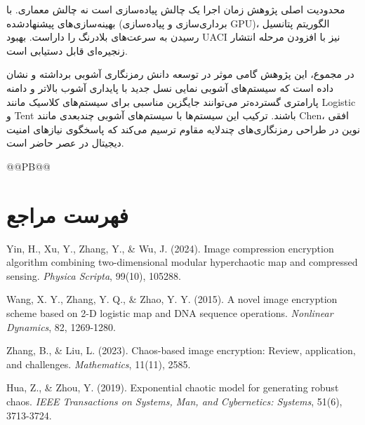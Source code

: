 محدودیت اصلی پژوهش  زمان اجرا یک چالش پیاده‌سازی است نه چالش معماری. با بهینه‌سازی‌های پیشنهادشده (برداری‌سازی و پیاده‌سازی GPU)، الگوریتم پتانسیل رسیدن به سرعت‌های بلادرنگ را داراست. بهبود UACI نیز با افزودن مرحله انتشار زنجیره‌ای قابل دستیابی است.

در مجموع، این پژوهش گامی موثر در توسعه دانش رمزنگاری آشوبی برداشته و نشان داده است که سیستم‌های آشوبی نمایی نسل جدید با پایداری آشوب بالاتر و دامنه پارامتری گسترده‌تر می‌توانند جایگزین مناسبی برای سیستم‌های کلاسیک مانند Logistic و Tent باشند. ترکیب این سیستم‌ها با سیستم‌های آشوبی چندبعدی مانند  Chen،  افقی نوین در طراحی رمزنگاری‌های چندلایه مقاوم ترسیم می‌کند که پاسخگوی نیازهای امنیت دیجیتال در عصر حاضر است.


@@PB@@




\renewcommand{\bibname}{فهرست منابع}
\addcontentsline{toc}{chapter}{\bibname}


\chapter*{فهرست مراجع}




 Yin, H., Xu, Y., Zhang, Y., \& Wu, J. (2024). Image compression encryption algorithm combining two-dimensional modular hyperchaotic map and compressed sensing. \textit{Physica Scripta}, 99(10), 105288.



 Wang, X. Y., Zhang, Y. Q., \& Zhao, Y. Y. (2015). A novel image encryption scheme based on 2-D logistic map and DNA sequence operations. \textit{Nonlinear Dynamics}, 82, 1269-1280.



 Zhang, B., \& Liu, L. (2023). Chaos-based image encryption: Review, application, and challenges. \textit{Mathematics}, 11(11), 2585.



 Hua, Z., \& Zhou, Y. (2019). Exponential chaotic model for generating robust chaos. \textit{IEEE Transactions on Systems, Man, and Cybernetics: Systems}, 51(6), 3713-3724.



